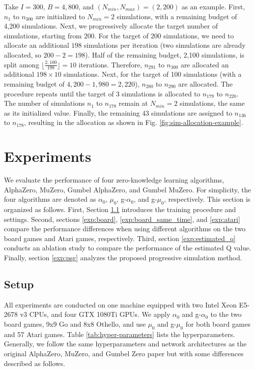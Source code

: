 

Take $I=300$, $B=4,800$, and $(N_{min}, N_{max})=(2, 200)$ as an example.
First, $n_{1}$ to $n_{300}$ are initialized to $N_{min}=2$ simulations, with a remaining budget of 4,200 simulations. 
Next, we progressively allocate the target number of simulations, starting from 200.
For the target of 200 simulations, we need to allocate an additional $198$ simulations per iteration (two simulations are already allocated, so $200-2=198$).
Half of the remaining budget, 2,100 simulations, is split among $\lfloor \frac{2,100}{198} \rfloor = 10$ iterations.
Therefore, $n_{291}$ to $n_{300}$ are allocated an additional $198 \times 10$ simulations. 
Next, for the target of 100 simulations (with a remaining budget of $4,200 - 1,980 = 2,220$), $n_{280}$ to $n_{290}$ are allocated. 
The procedure repeats until the target of 3 simulations is allocated to $n_{179}$ to $n_{220}$. The number of simulations $n_{1}$ to $n_{178}$ remain at $N_{min} = 2$ simulations, the same as its initialized value.
Finally, the remaining 43 simulations are assigned to $n_{136}$ to $n_{178}$, resulting in the allocation as shown in Fig. \ref{fig:sim-allocation-example}.


\section{Experiments}
We evaluate the performance of four zero-knowledge learning algorithms, AlphaZero, MuZero, Gumbel AlphaZero, and Gumbel MuZero.
For simplicity, the four algorithms are denoted as $\alpha_0$, $\mu_0$, g-$\alpha_0$, and g-$\mu_0$, respectively.
This section is organized as follows.
First, Section \ref{exp:setup} introduces the training procedure and settings.
Second, sections \ref{exp:board}, \ref{exp:board_same_time}, and \ref{exp:atari} compare the performance differences when using different algorithms on the two board games and Atari games, respectively.
Third, section \ref{exp:estimated_q} conducts an ablation study to compare the performance of the estimated Q value.
Finally, section \ref{exp:psg} analyzes the proposed progressive simulation method.



\subsection{Setup}\label{exp:setup}
All experiments are conducted on one machine equipped with two Intel Xeon E5-2678 v3 CPUs, and four GTX 1080Ti GPUs.
We apply $\alpha_0$ and g-$\alpha_0$ to the two board games, 9x9 Go and 8x8 Othello, and use $\mu_0$ and g-$\mu_0$ for both board games and 57 Atari games.
Table \ref{tab:hyper-parameters} lists the hyperparameters.
Generally, we follow the same hyperparameters and network architectures as the original AlphaZero, MuZero, and Gumbel Zero paper but with some differences described as follows.

